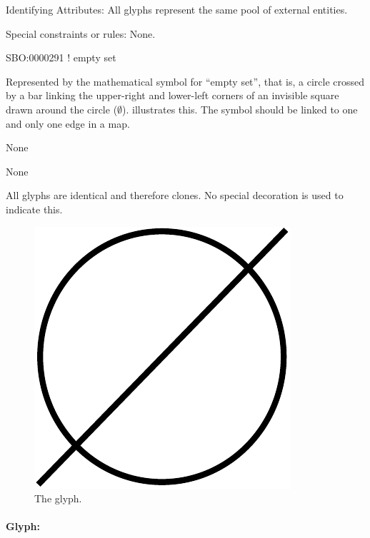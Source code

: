\begin{glyphDescription}

\item[Identifying Attributes:]\mbox{} All glyphs represent the same
  pool of external entities.

\item[Special constraints or rules:]\mbox{}\newline None.

\glyphSboTerm SBO:0000291 ! empty set

\glyphContainer Represented by the mathematical symbol for ``empty
set'', that is, a circle crossed by a bar linking the upper-right and
lower-left corners of an invisible square drawn around the circle ($\emptyset$).
 illustrates this.  The symbol should be linked to one
and only one edge in a map.

\glyphLabel None

\glyphAux None

\glyphCloning All glyphs are identical and therefore clones. No
special decoration is used to indicate this.

\end{glyphDescription}

\begin{figure}[H]
  \centering
  \includegraphics[scale = 0.3]{images/sourceSink}
  \caption{The  glyph.}
  \label{fig:sourceSink}
\end{figure}

\paragraph{Glyph: }
\label{sec:perturbing agent}
 
